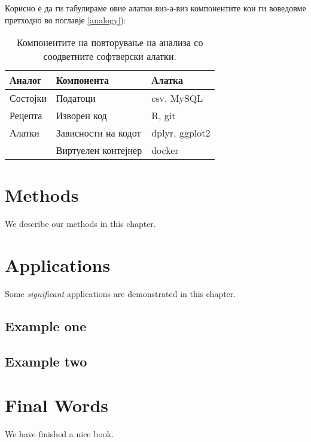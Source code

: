 \documentclass[
]{book}
\begin{document}
Корисно е да ги табулираме овие алатки виз-а-виз компонентите кои ги воведовме претходно во поглавје \ref{analogy}):

\begin{table}

\caption{\label{tab:unnamed-chunk-1}Компонентите на повторување на анализа со соодветните софтверски алатки.}
\centering
\begin{tabular}[t]{l|l|l}
\hline
Аналог & Компонента & Алатка\\
\hline
Состојки & Податоци & csv, MySQL\\
\hline
Рецепта & Изворен код & R, git\\
\hline
Алатки & Зависности на кодот & dplyr, ggplot2\\
\hline
 & Виртуелен контејнер & docker\\
\hline
\end{tabular}
\end{table}

\hypertarget{methods}{%
\chapter{Methods}\label{methods}}

We describe our methods in this chapter.

\hypertarget{applications}{%
\chapter{Applications}\label{applications}}

Some \emph{significant} applications are demonstrated in this chapter.

\hypertarget{example-one}{%
\section{Example one}\label{example-one}}

\hypertarget{example-two}{%
\section{Example two}\label{example-two}}

\hypertarget{final-words}{%
\chapter{Final Words}\label{final-words}}

We have finished a nice book.

  
\end{document}
